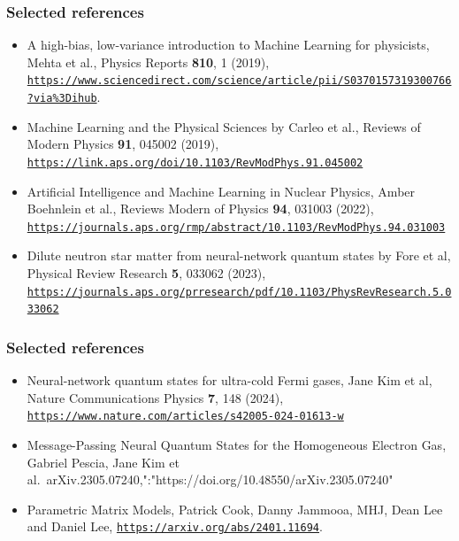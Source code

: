 \documentclass[11pt]{beamer} %
\begin{document}
\begin{frame}
\frametitle{Selected references}

\begin{itemize}
\item A high-bias, low-variance introduction to Machine Learning for physicists, Mehta et al., Physics Reports \textbf{810}, 1 (2019), \href{{https://www.sciencedirect.com/science/article/pii/S0370157319300766?via%3Dihub}}{\nolinkurl{https://www.sciencedirect.com/science/article/pii/S0370157319300766?via\%3Dihub}}.

\item Machine Learning and the Physical Sciences by Carleo et al., Reviews of Modern Physics \textbf{91}, 045002 (2019), \href{{https://link.aps.org/doi/10.1103/RevModPhys.91.045002}}{\nolinkurl{https://link.aps.org/doi/10.1103/RevModPhys.91.045002}}

\item Artificial Intelligence and Machine Learning in Nuclear Physics, Amber Boehnlein et al., Reviews Modern of Physics \textbf{94}, 031003 (2022), \href{{https://journals.aps.org/rmp/abstract/10.1103/RevModPhys.94.031003}}{\nolinkurl{https://journals.aps.org/rmp/abstract/10.1103/RevModPhys.94.031003}} 

\item Dilute neutron star matter from neural-network quantum states by Fore et al, Physical Review Research \textbf{5}, 033062 (2023), \href{{https://journals.aps.org/prresearch/pdf/10.1103/PhysRevResearch.5.033062}}{\nolinkurl{https://journals.aps.org/prresearch/pdf/10.1103/PhysRevResearch.5.033062}}
\end{itemize}

\noindent
\end{frame}

\begin{frame}
\frametitle{Selected references}

\begin{itemize}
\item Neural-network quantum states for ultra-cold Fermi gases, Jane Kim et al, Nature Communications Physics \textbf{7}, 148 (2024), \href{{https://www.nature.com/articles/s42005-024-01613-w}}{\nolinkurl{https://www.nature.com/articles/s42005-024-01613-w}}

\item Message-Passing Neural Quantum States for the Homogeneous Electron Gas, Gabriel Pescia, Jane Kim et al.~arXiv.2305.07240,":"https://doi.org/10.48550/arXiv.2305.07240"

\item Parametric Matrix Models, Patrick Cook, Danny Jammooa, MHJ, Dean Lee and Daniel Lee, \href{{https://arxiv.org/abs/2401.11694}}{\nolinkurl{https://arxiv.org/abs/2401.11694}}. 
\end{itemize}

\noindent
\end{frame}
\end{document}
